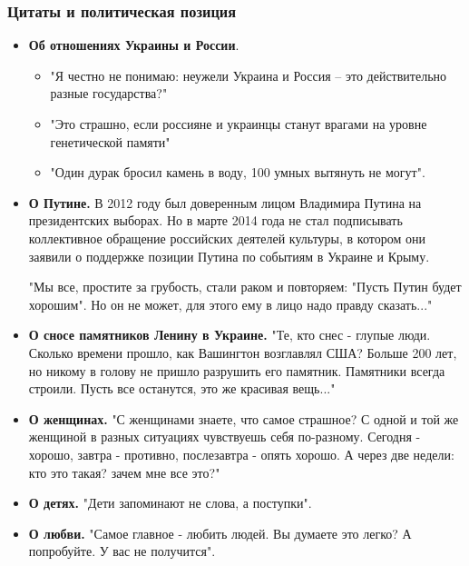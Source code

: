  
 
 

\subsubsection{Цитаты и политическая позиция}

\begin{itemize}
	
	\item \textbf{Об отношениях Украины и России}. 
		\begin{itemize}
			\item "Я честно не понимаю: неужели Украина и
			Россия – это действительно разные государства?"
			
			\item "Это страшно, если россияне и украинцы станут врагами на уровне
			генетической памяти"
			
			\item "Один дурак бросил камень в воду, 100 умных вытянуть не могут".
		\end{itemize}

	\item \textbf{О Путине.} В 2012 году был доверенным лицом Владимира Путина на
   президентских выборах. Но в марте 2014 года не стал подписывать
   коллективное обращение российских деятелей культуры, в котором они заявили
   о поддержке позиции Путина по событиям в Украине и Крыму.

   "Мы все, простите за грубость, стали раком и повторяем: "Пусть Путин будет
   хорошим". Но он не может, для этого ему в лицо надо правду сказать..."

	\item \textbf{О сносе памятников Ленину в Украине.} "Те, кто снес - глупые люди. Сколько
   времени прошло, как Вашингтон возглавлял США? Больше 200 лет, но никому в
   голову не пришло разрушить его памятник. Памятники всегда строили. Пусть
   все останутся, это же красивая вещь..."

	\item \textbf{О женщинах.} "С женщинами знаете, что самое страшное? С одной и той же
   женщиной в разных ситуациях чувствуешь себя по-разному. Сегодня - хорошо,
   завтра - противно, послезавтра - опять хорошо. А через две недели: кто это
   такая? зачем мне все это?"

	\item 	\textbf{О детях.} "Дети запоминают не слова, а поступки".
	\item 	\textbf{О любви.} "Самое главное - любить людей. Вы думаете это легко? А
   попробуйте. У вас не получится".

\end{itemize}

